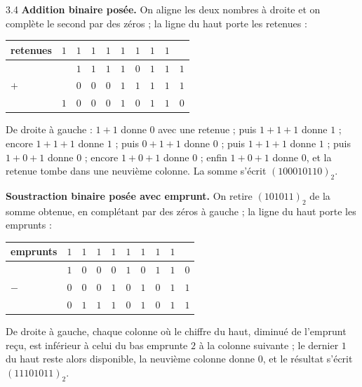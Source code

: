 \begin{corrige}{3.4}
\textbf{Addition binaire posée.} On aligne les deux nombres à droite et on complète le second par des zéros ; la ligne du haut porte les retenues :
\begin{center}
\setlength{\tabcolsep}{4pt}
\begin{tabular}{L{1.5cm}C{0.5cm}C{0.5cm}C{0.5cm}C{0.5cm}C{0.5cm}C{0.5cm}C{0.5cm}C{0.5cm}C{0.5cm}}
\toprule
{}retenues & $1$ & $1$ & $1$ & $1$ & $1$ & $1$ & $1$ & $1$ & \\
\midrule
& & $1$ & $1$ & $1$ & $1$ & $0$ & $1$ & $1$ & $1$ \\
$+$ & & $0$ & $0$ & $0$ & $1$ & $1$ & $1$ & $1$ & $1$ \\
\midrule
& $1$ & $0$ & $0$ & $0$ & $1$ & $0$ & $1$ & $1$ & $0$ \\
\bottomrule
\end{tabular}
\end{center}
De droite à gauche : $1+1$ donne $0$ avec une retenue ; puis $1+1+1$ donne $1$ ; encore $1+1+1$ donne $1$ ; puis $0+1+1$ donne $0$ ; puis $1+1+1$ donne $1$ ; puis $1+0+1$ donne $0$ ; encore $1+0+1$ donne $0$ ; enfin $1+0+1$ donne $0$, et la retenue tombe dans une neuvième colonne. La somme s'écrit $(100010110)_2$.

\textbf{Soustraction binaire posée avec emprunt.} On retire $(101011)_2$ de la somme obtenue, en complétant par des zéros à gauche ; la ligne du haut porte les emprunts :
\begin{center}
\setlength{\tabcolsep}{4pt}
\begin{tabular}{L{1.5cm}C{0.5cm}C{0.5cm}C{0.5cm}C{0.5cm}C{0.5cm}C{0.5cm}C{0.5cm}C{0.5cm}C{0.5cm}}
\toprule
{}emprunts & $1$ & $1$ & $1$ & $1$ & $1$ & $1$ & $1$ & $1$ & \\
\midrule
& $1$ & $0$ & $0$ & $0$ & $1$ & $0$ & $1$ & $1$ & $0$ \\
$-$ & $0$ & $0$ & $0$ & $1$ & $0$ & $1$ & $0$ & $1$ & $1$ \\
\midrule
& $0$ & $1$ & $1$ & $1$ & $0$ & $1$ & $0$ & $1$ & $1$ \\
\bottomrule
\end{tabular}
\end{center}
De droite à gauche, chaque colonne où le chiffre du haut, diminué de l'emprunt reçu, est inférieur à celui du bas emprunte $2$ à la colonne suivante ; le dernier $1$ du haut reste alors disponible, la neuvième colonne donne $0$, et le résultat s'écrit $(11101011)_2$.


\end{corrige}
